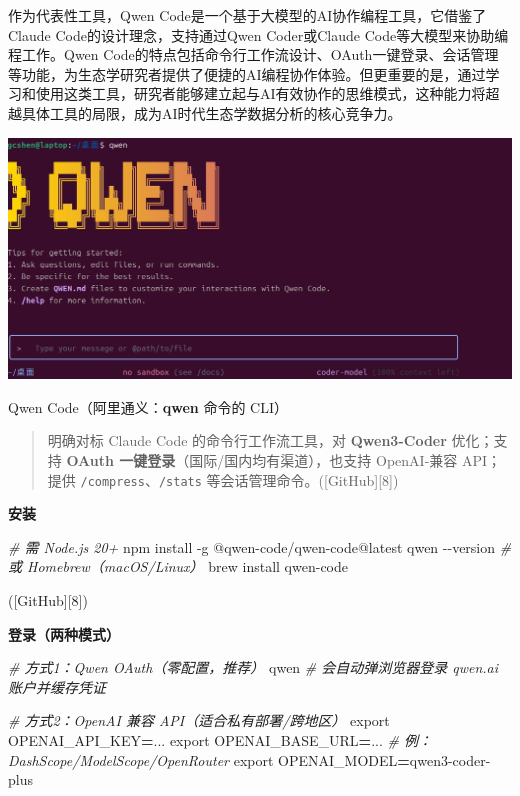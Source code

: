\documentclass[
]{book}
\newenvironment{Shaded}{\begin{snugshade}}{\end{snugshade}}
\newcommand{\AttributeTok}[1]{\textcolor[rgb]{0.13,0.29,0.53}{#1}}
\newcommand{\BuiltInTok}[1]{#1}
\newcommand{\CommentTok}[1]{\textcolor[rgb]{0.56,0.35,0.01}{\textit{#1}}}
\newcommand{\ExtensionTok}[1]{#1}
\newcommand{\NormalTok}[1]{#1}
\newcommand{\OperatorTok}[1]{\textcolor[rgb]{0.81,0.36,0.00}{\textbf{#1}}}
\newcommand{\VariableTok}[1]{\textcolor[rgb]{0.00,0.00,0.00}{#1}}
\begin{document}
作为代表性工具，Qwen Code是一个基于大模型的AI协作编程工具，它借鉴了Claude Code的设计理念，支持通过Qwen Coder或Claude Code等大模型来协助编程工作。Qwen Code的特点包括命令行工作流设计、OAuth一键登录、会话管理等功能，为生态学研究者提供了便捷的AI编程协作体验。但更重要的是，通过学习和使用这类工具，研究者能够建立起与AI有效协作的思维模式，这种能力将超越具体工具的局限，成为AI时代生态学数据分析的核心竞争力。

\includegraphics{imgs/qwen-code.jpg}

Qwen Code（阿里通义：\textbf{qwen} 命令的 CLI）

\begin{quote}
明确对标 Claude Code 的命令行工作流工具，对 \textbf{Qwen3-Coder} 优化；支持 \textbf{OAuth 一键登录}（国际/国内均有渠道），也支持 OpenAI-兼容 API；提供 \texttt{/compress}、\texttt{/stats} 等会话管理命令。({[}GitHub{]}{[}8{]})
\end{quote}

\textbf{安装}

\begin{Shaded}
\begin{Highlighting}[]
\CommentTok{\# 需 Node.js 20+}
\ExtensionTok{npm}\NormalTok{ install }\AttributeTok{{-}g}\NormalTok{ @qwen{-}code/qwen{-}code@latest}
\ExtensionTok{qwen} \AttributeTok{{-}{-}version}
\CommentTok{\# 或 Homebrew（macOS/Linux）}
\ExtensionTok{brew}\NormalTok{ install qwen{-}code}
\end{Highlighting}
\end{Shaded}

({[}GitHub{]}{[}8{]})

\textbf{登录（两种模式）}

\begin{Shaded}
\begin{Highlighting}[]
\CommentTok{\# 方式1：Qwen OAuth（零配置，推荐）}
\ExtensionTok{qwen}    \CommentTok{\# 会自动弹浏览器登录 qwen.ai 账户并缓存凭证}

\CommentTok{\# 方式2：OpenAI 兼容 API（适合私有部署/跨地区）}
\BuiltInTok{export} \VariableTok{OPENAI\_API\_KEY}\OperatorTok{=}\NormalTok{...}
\BuiltInTok{export} \VariableTok{OPENAI\_BASE\_URL}\OperatorTok{=}\NormalTok{...    }\CommentTok{\# 例：DashScope/ModelScope/OpenRouter}
\BuiltInTok{export} \VariableTok{OPENAI\_MODEL}\OperatorTok{=}\NormalTok{qwen3{-}coder{-}plus}
\end{Highlighting}
\end{Shaded}
\end{document}
